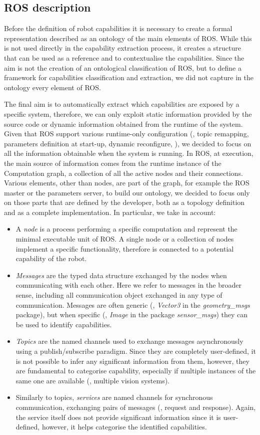 \subsection{ROS description}
\label{sec:ros-desc}
Before the definition of robot capabilities it is necessary to create a formal representation described as an ontology of the main elements of ROS. While this is not used directly in the capability extraction process, it creates a structure that can be used as a reference and to contextualise the capabilities. Since the aim is not the creation of an ontological classification of ROS, but to define a framework for capabilities classification and extraction, we did not capture in the ontology every element of ROS. 

The final aim is to automatically extract which capabilities are exposed by a specific system, therefore, we can only exploit static information provided by the source code or dynamic information obtained from the runtime of the system. Given that ROS support various runtime-only configuration (\eg, topic remapping, parameters definition at start-up, dynamic reconfigure, \etc), we decided to focus on all the information obtainable when the system is running. In ROS, at execution, the main source of information comes from the runtime instance of the Computation graph, a collection of all the active nodes and their connections. Various elements, other than nodes, are part of the graph, for example the ROS master or the parameters server, to build our ontology, we decided to focus only on those parts that are defined by the developer, both as a topology definition and as a complete implementation. In particular, we take in account:
\begin{itemize}
\item A \textit{node} is a process performing a specific computation and represent the minimal executable unit of ROS. A single node or a collection of nodes implement a specific functionality, therefore is connected to a potential capability of the robot.
\item \textit{Messages} are the typed data structure exchanged by the nodes when communicating with each other. Here we refer to messages in the broader sense, including all communication object exchanged in any type of communication. Messages are often generic (\eg, \textit{Vector3} in the \textit{geometry\_msgs} package), but when specific (\eg, \textit{Image} in the package \textit{sensor\_msgs})  they can be used to identify capabilities.
\item \textit{Topics} are the named channels used to exchange messages asynchronously using a publish/subscribe paradigm. Since they are completely user-defined, it is not possible to infer any significant information from them, however, they are fundamental to categorise capability, especially if multiple instances of the same one are available (\eg, multiple vision systems).
\item Similarly to topics, \textit{services} are named channels for synchronous communication, exchanging pairs of messages (\ie, request and response). Again, the service itself does not provide significant information since it is user-defined, however, it helps categorise the identified capabilities.  
\end{itemize}
